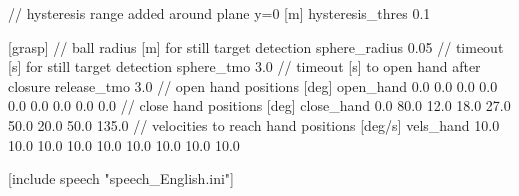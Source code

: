 \begin{DoxyCode}
\textcolor{comment}{// hysteresis range added around plane y=0 [m]}
hysteresis\_thres 0.1

[grasp]
\textcolor{comment}{// ball radius [m] for still target detection}
sphere\_radius   0.05
\textcolor{comment}{// timeout [s] for still target detection}
sphere\_tmo      3.0
\textcolor{comment}{// timeout [s] to open hand after closure}
release\_tmo     3.0
\textcolor{comment}{// open hand positions [deg]}
open\_hand       0.0 0.0 0.0   0.0   0.0 0.0 0.0   0.0   0.0
\textcolor{comment}{// close hand positions [deg]}
close\_hand      0.0 80.0 12.0 18.0 27.0 50.0 20.0  50.0 135.0
\textcolor{comment}{// velocities to reach hand positions [deg/s]}
vels\_hand       10.0 10.0  10.0 10.0 10.0 10.0 10.0 10.0  10.0

[include speech "speech\_English.ini"]
\end{DoxyCode}


